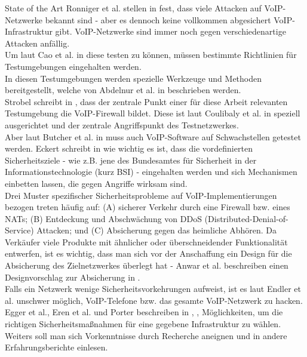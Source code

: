 \begin{section}{State of the Art}
Ronniger et al. stellen in \cite{Ronniger:2010:robflex}  fest, dass viele Attacken auf VoIP-Netzwerke bekannt sind - aber es dennoch keine vollkommen abgesichert VoIP-Infrastruktur gibt. VoIP-Netzwerke sind immer noch gegen verschiedenartige Attacken anfällig. \\
Um laut Cao et al. in \cite{CaoWang:2009:DevLab} diese testen zu können, müssen bestimmte Richtlinien für Testumgebungen eingehalten
werden. \\
In diesen Testumgebungen werden spezielle Werkzeuge und Methoden bereitgestellt, welche von Abdelnur et al. in \cite{Abdelnur:2006:voipass} beschrieben werden.  \\
Strobel schreibt in \cite{Coulibaly:2010:secvoipb}, dass der zentrale Punkt einer für diese Arbeit relevanten Testumgebung die VoIP-Firewall bildet. Diese ist laut Coulibaly et al. in \cite{Coulibaly:2010:secvoipb}  speziell ausgerichtet und der zentrale Angriffspunkt des Testnetzwerkes. \\
Aber laut Butcher et al. in  \cite{Butcher:2007:SecChall}   muss auch VoIP-Software auf Schwachstellen getestet werden. 
Eckert schreibt in  \cite{eckert:2009:sicherheit} wie wichtig es ist, dass die vordefinierten Sicherheitsziele - wie z.B. jene des Bundesamtes für Sicherheit in der Informationstechnologie (kurz BSI) - eingehalten werden und sich
Mechanismen einbetten lassen, die gegen Angriffe wirksam sind. 
\\
Drei Muster spezifischer Sicherheitsprobleme auf VoIP-Implementierungen bezogen treten
häufig auf: (A) sicherer Verkehr durch eine Firewall bzw. eines NATs; (B) Entdeckung und
Abschwächung von DDoS (Distributed-Denial-of-Service) Attacken; und (C) Absicherung
gegen das heimliche Abhören. Da Verkäufer viele Produkte mit ähnlicher oder
überschneidender Funktionalität entwerfen, ist es wichtig, dass man sich vor der
Anschaffung ein Design für die Absicherung des Zielnetzwerkes überlegt hat - Anwar et al. beschreiben einen Designvorschlag zur Absicherung in \cite{Anwar:2006:despatt} .\\
Falls ein Netzwerk wenige Sicherheitsvorkehrungen aufweist, ist es laut Endler et al. \cite{endler:2006:hacking} unschwer möglich, VoIP-Telefone bzw. das gesamte VoIP-Netzwerk zu hacken.
 \\
Egger et al., Eren et al. und Porter beschreiben in \cite{Egger:2008:linVoip} ,\cite{eren:2007:voip} ,\cite{porter:2006:practicalvoip} Möglichkeiten, um die richtigen Sicherheitsmaßnahmen für eine gegebene Infrastruktur zu wählen. Weiters soll man sich Vorkenntnisse durch Recherche aneignen und in andere Erfahrungsberichte einlesen. \\

\end{section}
\pagebreak

